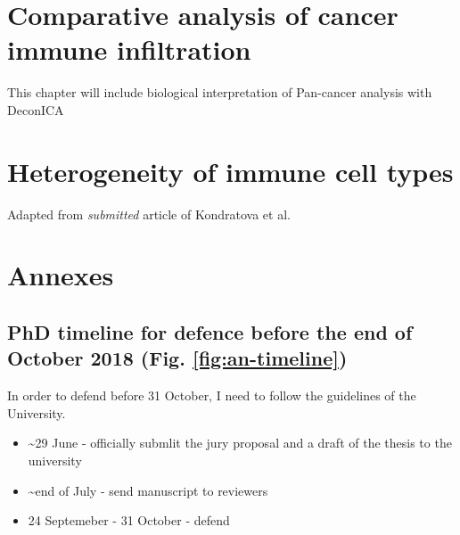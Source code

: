 \documentclass[12pt,]{book}
\providecommand{\tightlist}{%
  \setlength{\itemsep}{0pt}\setlength{\parskip}{0pt}}
\theoremstyle{definition}
\theoremstyle{definition}
\theoremstyle{definition}
\theoremstyle{remark}
\begin{document}
\hypertarget{results}{%
\chapter{Comparative analysis of cancer immune
infiltration}\label{results}}

This chapter will include biological interpretation of Pan-cancer
analysis with DeconICA

\hypertarget{section}{%
\section{}\label{section}}

\hypertarget{map}{%
\chapter{Heterogeneity of immune cell types}\label{map}}

Adapted from \emph{submitted} article of Kondratova et al.



\hypertarget{annexes}{%
\chapter*{Annexes}\label{annexes}}

\hypertarget{phd-timeline-for-defence-before-the-end-of-october-2018-fig.-reffigan-timeline}{%
\section*{PhD timeline for defence before the end of October 2018 (Fig.
\ref{fig:an-timeline})}\label{phd-timeline-for-defence-before-the-end-of-october-2018-fig.-reffigan-timeline}}

In order to defend before 31 October, I need to follow the guidelines of
the University.

\begin{itemize}
\tightlist
\item
  \textasciitilde{}29 June - officially submlit the jury proposal and a
  draft of the thesis to the university
\item
  \textasciitilde{}end of July - send manuscript to reviewers
\item
  24 Septemeber - 31 October - defend
\end{itemize}
\end{document}
